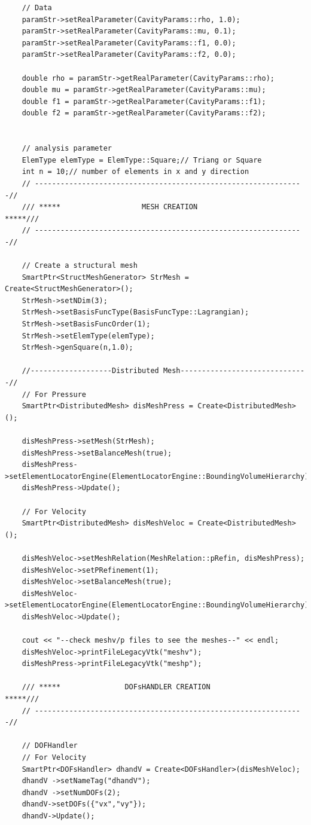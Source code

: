 \documentclass[]{article}
\begin{document}
\begin{lstlisting}
	// Data
	paramStr->setRealParameter(CavityParams::rho, 1.0);
	paramStr->setRealParameter(CavityParams::mu, 0.1);
	paramStr->setRealParameter(CavityParams::f1, 0.0);
	paramStr->setRealParameter(CavityParams::f2, 0.0);
	
	double rho = paramStr->getRealParameter(CavityParams::rho);
	double mu = paramStr->getRealParameter(CavityParams::mu);
	double f1 = paramStr->getRealParameter(CavityParams::f1);
	double f2 = paramStr->getRealParameter(CavityParams::f2);
	
	
	// analysis parameter
	ElemType elemType = ElemType::Square;// Triang or Square
	int n = 10;// number of elements in x and y direction 
	// ---------------------------------------------------------------//
	/// *****                   MESH CREATION                   *****///
	// ---------------------------------------------------------------//
	
	// Create a structural mesh       
	SmartPtr<StructMeshGenerator> StrMesh = Create<StructMeshGenerator>();
	StrMesh->setNDim(3);
	StrMesh->setBasisFuncType(BasisFuncType::Lagrangian);
	StrMesh->setBasisFuncOrder(1);
	StrMesh->setElemType(elemType);
	StrMesh->genSquare(n,1.0);
	
	//-------------------Distributed Mesh------------------------------//
	// For Pressure
	SmartPtr<DistributedMesh> disMeshPress = Create<DistributedMesh>();
	
	disMeshPress->setMesh(StrMesh);
	disMeshPress->setBalanceMesh(true);
	disMeshPress->setElementLocatorEngine(ElementLocatorEngine::BoundingVolumeHierarchy);
	disMeshPress->Update();
	
	// For Velocity
	SmartPtr<DistributedMesh> disMeshVeloc = Create<DistributedMesh>();
	
	disMeshVeloc->setMeshRelation(MeshRelation::pRefin, disMeshPress);
	disMeshVeloc->setPRefinement(1);
	disMeshVeloc->setBalanceMesh(true);
	disMeshVeloc->setElementLocatorEngine(ElementLocatorEngine::BoundingVolumeHierarchy);
	disMeshVeloc->Update();
	
	cout << "--check meshv/p files to see the meshes--" << endl;
	disMeshVeloc->printFileLegacyVtk("meshv");
	disMeshPress->printFileLegacyVtk("meshp");

	/// *****               DOFsHANDLER CREATION                *****///
	// ---------------------------------------------------------------//
	
	// DOFHandler
	// For Velocity
	SmartPtr<DOFsHandler> dhandV = Create<DOFsHandler>(disMeshVeloc);
	dhandV ->setNameTag("dhandV");
	dhandV ->setNumDOFs(2);
	dhandV->setDOFs({"vx","vy"});
	dhandV->Update();
	

\end{lstlisting}
\end{document}
